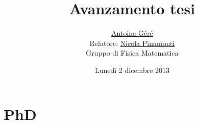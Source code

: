\documentclass[a4paper,11pt]{beamer} %
\begin{document}

\begin{frame}
\title{Avanzamento tesi}
\date{Lunedì 2 dicembre 2013}
\author{\href{mailto:gere@dima.unige.it}{Antoine Géré} \\
 \medskip \footnotesize{Relatore: \href{http://www.pinamonti.eu/}{Nicola Pinamonti}} \\
 \medskip \footnotesize{Gruppo di Fisica Matematica}}
\titlepage
\begin{figure}[h]
\end{figure}
\end{frame}

\section{PhD} 
\end{document}

